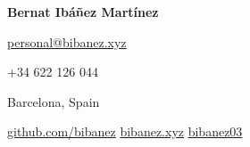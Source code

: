 \documentclass{article}
\newcommand\textbox[1]{%
  \parbox{.333\textwidth}{#1}%
}
\begin{document}

\setlength{\parindent}{2em}
\setlength{\parskip}{1pt}
\enlargethispage{40pt}

\begin{center}
\Huge \textbf{Bernat Ibáñez Martínez}
\vspace{10pt}

\large
\textbox{\href{mailto:work@bibanez.xyz}{personal@bibanez.xyz}\hfill}\textbox{\hfil +34 622 126 044\hfil}\textbox{\hfill Barcelona, Spain}

\hspace*{\fill} {\faGithub \hspace{2pt} \href{https://github.com/bibanez}{github.com/bibanez}} \hfill {\faGlobeEurope\hspace{2pt} \href{https://bibanez.xyz}{bibanez.xyz}} \hfill {\faLinkedin\hspace{2pt} \href{https://www.linkedin.com/in/bibanez03/}{bibanez03}}
\hspace*{\fill}

\hrulefill
\end{center}

\setlength{\parindent}{2em}

\normalsize
\vspace{-10pt}

\vspace{-10pt}

\vspace{-10pt}

\vspace{-10pt}

\end{document}
